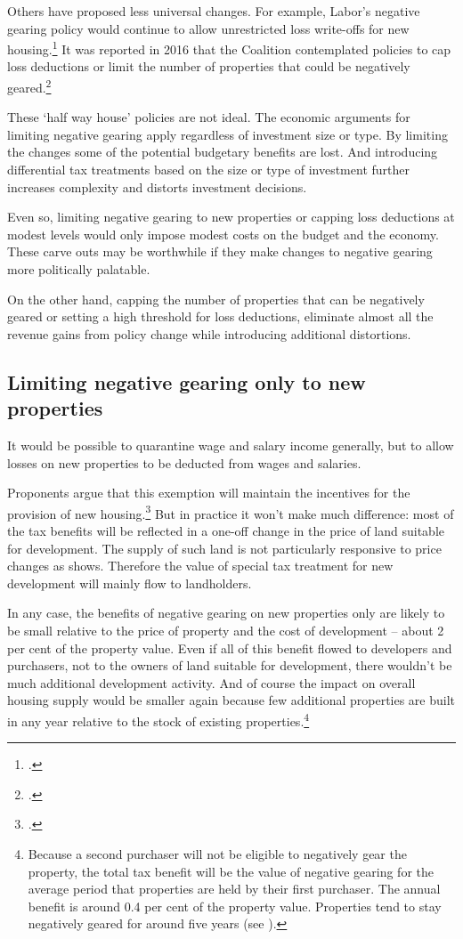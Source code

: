 Others have proposed less universal changes. For example, Labor’s negative gearing policy would continue to allow unrestricted loss write-offs for new housing.\footcite{ALP2016PositivePlanHousing} It was reported in 2016 that the Coalition contemplated policies to cap loss deductions or limit the number of properties that could be negatively geared.\footcite{Coorey2016}  

These ‘half way house’ policies are not ideal. The economic arguments for limiting negative gearing apply regardless of investment size or type. By limiting the changes some of the potential budgetary benefits are lost. And introducing differential tax treatments based on the size or type of investment further increases complexity and distorts investment decisions. 

Even so, limiting negative gearing to new properties or capping loss deductions at modest levels would only impose modest costs on the budget and the economy. These carve outs may be worthwhile if they make changes to negative gearing more politically palatable.

On the other hand, capping the number of properties that can be negatively geared or setting a high threshold for loss deductions, eliminate almost all the revenue gains from policy change while introducing additional distortions. 

\subsection{Limiting negative gearing only to new properties}
It would be possible to quarantine wage and salary income generally, but to allow losses on new properties to be deducted from wages and salaries. 

Proponents argue that this exemption will maintain the incentives for the provision of new housing.\footcite[][28]{McKellInstitute2015SwitchingGears}  But in practice it won’t make much difference: most of the tax benefits will be reflected in a one-off change in the price of land suitable for development. The supply of such land is not particularly responsive to price changes as  shows. Therefore the value of special tax treatment for new development will mainly flow to landholders. 

In any case, the benefits of negative gearing on new properties only are likely to be small relative to the price of property and the cost of development – about 2 per cent of the property value.  Even if all of this benefit flowed to developers and purchasers, not to the owners of land suitable for development, there wouldn’t be much additional development activity. And of course the impact on overall housing supply would be smaller again because few additional properties are built in any year relative to the stock of existing properties.\footnote{Because a second purchaser will not be eligible to negatively gear the property, the total tax benefit will be the value of negative gearing for the average period that properties are held by their first purchaser. The annual benefit is around 0.4 per cent of the property value. Properties tend to stay negatively geared for around five years (see \stopifendnote{}).} 


